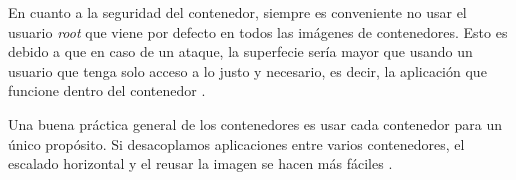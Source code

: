 En cuanto a la seguridad del contenedor, siempre es conveniente no usar el usuario \textit{root} que viene por defecto en todos las imágenes de contenedores. Esto es debido a que en caso de un ataque, la superfecie sería mayor que usando un usuario que tenga solo acceso a lo justo y necesario, es decir, la aplicación que funcione dentro del contenedor \cite{dockerbestpracticesdev}.\newline

Una buena práctica general de los contenedores es usar cada contenedor para un único propósito. Si desacoplamos aplicaciones entre varios contenedores, el escalado horizontal y el reusar la imagen se hacen más fáciles \cite{dockerbestpractices}.
